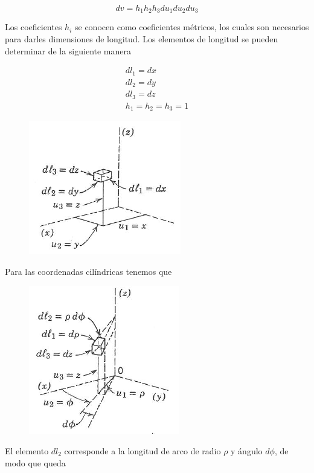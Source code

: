 \begin{equation*}
dv = h_1 h_2 h_3 du_1 du_2 du_3
\end{equation*}

Los coeficientes $h_i$ se conocen como coeficientes métricos, los cuales son necesarios para darles dimensiones de longitud. Los elementos de longitud se pueden determinar de la siguiente manera

\begin{eqnarray*}
dl_1 = dx \\
dl_2 = dy \\
dl_3 = dz \\
h_1 = h_2 = h_3 = 1
\end{eqnarray*}

\begin{figure}[H]
    \centering
    \includegraphics{Waves/waves_f1.png}
\end{figure}

Para las coordenadas cilíndricas tenemos que 

\begin{figure}[H]
    \centering
    \includegraphics{Waves/waves_f2.png}
\end{figure}

El elemento $dl_2$ corresponde a la longitud de arco de radio $\rho$ y ángulo $d \phi$, de modo que queda

